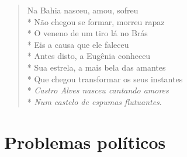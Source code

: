 \begin{verse}
Na Bahia nasceu, amou, sofreu\\*
Não chegou se formar, morreu rapaz\\*
O veneno de um tiro lá no Brás\\*
Eis a causa que ele faleceu\\*
Antes disto, a Eugênia conheceu\\*
Sua estrela, a mais bela das amantes\\*
Que chegou transformar os seus instantes\\*
\textit{Castro Alves nasceu cantando amores}\\*
\textit{Num castelo de espumas flutuantes}.
\end{verse}


\chapter{Problemas políticos}

